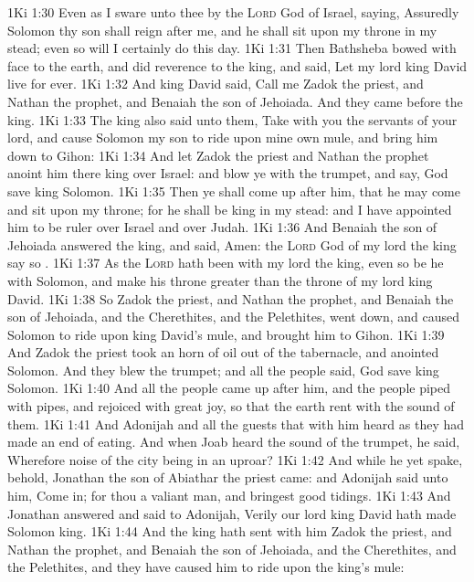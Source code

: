 \vs 1Ki 1:30 Even as I sware unto thee by the \textsc{Lord} God of Israel, saying, Assuredly Solomon thy son shall reign after me, and he shall sit upon my throne in my stead; even so will I certainly do this day.
\vs 1Ki 1:31 Then Bathsheba bowed with  face to the earth, and did reverence to the king, and said, Let my lord king David live for ever.
\vs 1Ki 1:32 And king David said, Call me Zadok the priest, and Nathan the prophet, and Benaiah the son of Jehoiada. And they came before the king.
\vs 1Ki 1:33 The king also said unto them, Take with you the servants of your lord, and cause Solomon my son to ride upon mine own mule, and bring him down to Gihon:
\vs 1Ki 1:34 And let Zadok the priest and Nathan the prophet anoint him there king over Israel: and blow ye with the trumpet, and say, God save king Solomon.
\vs 1Ki 1:35 Then ye shall come up after him, that he may come and sit upon my throne; for he shall be king in my stead: and I have appointed him to be ruler over Israel and over Judah.
\vs 1Ki 1:36 And Benaiah the son of Jehoiada answered the king, and said, Amen: the \textsc{Lord} God of my lord the king say so .
\vs 1Ki 1:37 As the \textsc{Lord} hath been with my lord the king, even so be he with Solomon, and make his throne greater than the throne of my lord king David.
\vs 1Ki 1:38 So Zadok the priest, and Nathan the prophet, and Benaiah the son of Jehoiada, and the Cherethites, and the Pelethites, went down, and caused Solomon to ride upon king David's mule, and brought him to Gihon.
\vs 1Ki 1:39 And Zadok the priest took an horn of oil out of the tabernacle, and anointed Solomon. And they blew the trumpet; and all the people said, God save king Solomon.
\vs 1Ki 1:40 And all the people came up after him, and the people piped with pipes, and rejoiced with great joy, so that the earth rent with the sound of them.
\vs 1Ki 1:41 And Adonijah and all the guests that  with him heard  as they had made an end of eating. And when Joab heard the sound of the trumpet, he said, Wherefore  noise of the city being in an uproar?
\vs 1Ki 1:42 And while he yet spake, behold, Jonathan the son of Abiathar the priest came: and Adonijah said unto him, Come in; for thou  a valiant man, and bringest good tidings.
\vs 1Ki 1:43 And Jonathan answered and said to Adonijah, Verily our lord king David hath made Solomon king.
\vs 1Ki 1:44 And the king hath sent with him Zadok the priest, and Nathan the prophet, and Benaiah the son of Jehoiada, and the Cherethites, and the Pelethites, and they have caused him to ride upon the king's mule:
